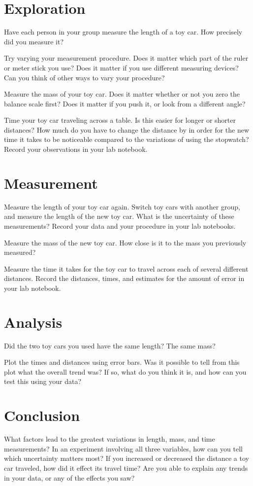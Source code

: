 \documentclass{article}
\begin{document}
\section{Exploration}

Have each person in your group measure the length of a toy car. How
precisely did you measure it?

Try varying your measurement procedure. Does it matter which part of
the ruler or meter stick you use? Does it matter if you use different measuring devices? Can you think of other ways to vary your procedure? 

Measure the mass of your toy car. Does it matter whether or not you
zero the balance scale first? Does it matter if you push it, or look
from a different angle? 

Time your toy car traveling across a table. Is this easier for longer
or shorter distances? How much do you have to change the distance by
in order for the new time it takes to be noticeable compared to the
variations of using the stopwatch? Record your observations in your
lab notebook.

\section{Measurement}

Measure the length of your toy car again. Switch toy cars with another
group, and measure the length of the new toy car. What is the
uncertainty of these measurements? Record your data and your procedure
in your lab notebooks.

Measure the mass of the new toy car. How close is it to the mass you
previously measured?

Measure the time it takes for the toy car to travel across each of
several different distances. Record the distances, times, and
estimates for the amount of error in your lab notebook.

\section{Analysis}

Did the two toy cars you used have the same length? The same mass?

Plot the times and distances using error bars. Was it possible to tell
from this plot what the overall trend was? If so, what do you think it
is, and how can you test this using your data?

\section{Conclusion}

What factors lead to the greatest variations in length, mass, and time
measurements? In an experiment involving all three variables, how can
you tell which uncertainty matters most? If you increased or decreased
the distance a toy car traveled, how did it effect its travel time?
Are you able to explain any trends in your data, or any of the effects
you saw?
\end{document}
